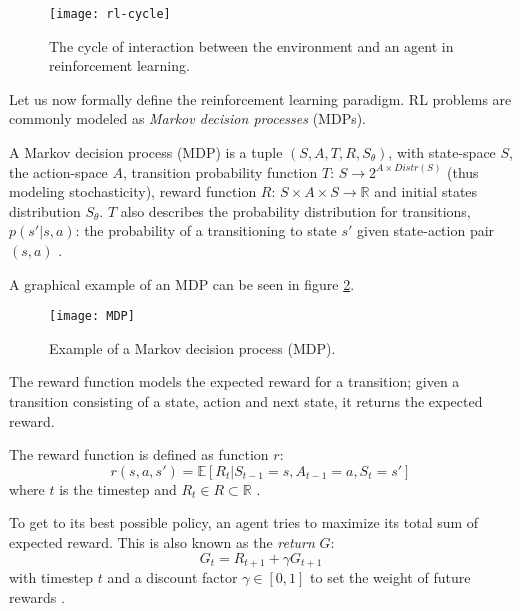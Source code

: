\begin{figure}[h]
    \centering
    \texttt{[image: rl-cycle]}
    \caption{The cycle of interaction between the environment and an agent in reinforcement learning.}
    \label{fig:rl_cycle}
\end{figure}

Let us now formally define the reinforcement learning paradigm. RL problems are commonly modeled as \emph{Markov decision processes} (MDPs). 

\begin{definition} A Markov decision process (MDP) is a tuple $(S, A, T, R, S_{\theta})$, with state-space $S$, the action-space $A$, transition  probability function $T$: $S \rightarrow 2^{A \times Distr(S)}$ (thus modeling stochasticity), reward function $R$: $S \times A \times S \rightarrow \mathbb{R}$ and initial states distribution $S_{\theta}$. $T$ also describes the probability distribution for transitions, $p(s'|s,a)$: the probability of a transitioning to state $s'$ given state-action pair $(s, a)$ \cite[p. 45-62]{grokking}.
\end{definition}

A graphical example of an MDP can be seen in figure \ref{fig:mdp}.

\begin{figure}[h]
    \centering
    \texttt{[image: MDP]}
    \caption{Example of a Markov decision process (MDP).}
    \label{fig:mdp}
\end{figure}

The reward function models the expected reward for a transition; given a transition consisting of a state, action and next state, it returns the expected reward.

The reward function is defined as function $r$:
\begin{equation}
	\label{reward}
	r(s, a, s') = \mathds{E}[R_{t} | S_{t-1} = s, A_{t-1} = a, S_{t} = s']
\end{equation}
where $t$ is the timestep and $R_{t} \in R \subset \mathbb{R}$ \cite[p. 54]{grokking}.

To get to its best possible policy, an agent tries to maximize its total sum of expected reward. This is also known as the \emph{return} $G$: 
\begin{equation}
G_t = R_{t+1} + \gamma G_{t+1}
\end{equation}
with timestep $t$ and a discount factor $\gamma \in [0,1]$ to set the weight of future rewards \cite[p. 67]{grokking}. 

